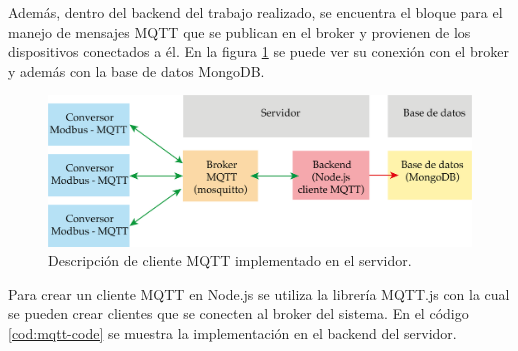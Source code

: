 Además, dentro del backend del trabajo realizado, se encuentra el bloque para el manejo de mensajes MQTT que se publican en el broker y provienen de los dispositivos conectados a él.  En la figura \ref{fig:backend-mqtt-server} se puede ver su conexión con el broker y además con la base de datos MongoDB. 

\begin{figure}[htpb]
	\centering
	\includegraphics[scale=.75]{./Figures/backend-mqtt.png}
	\caption[Descripción bloque cliente MQTT]{Descripción de cliente MQTT implementado en el servidor.}
	\label{fig:backend-mqtt-server}
\end{figure}


Para crear un cliente MQTT en Node.js se utiliza la librería MQTT.js \citep{WEBSITE:38} con la cual se pueden crear clientes que se conecten al broker del sistema. En el código \ref{cod:mqtt-code} se muestra la implementación en el backend del servidor.

